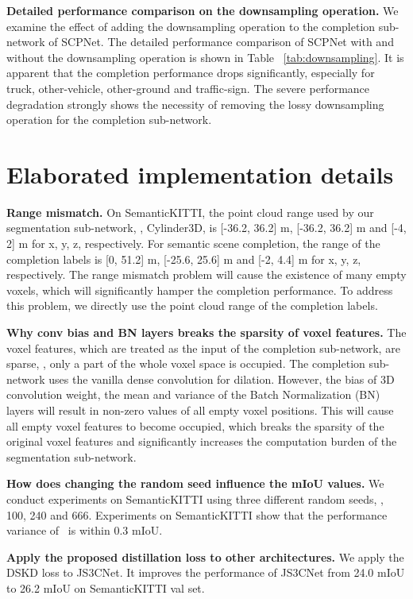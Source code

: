 \documentclass[10pt,twocolumn,letterpaper]{article}
\begin{document}
\noindent \textbf{Detailed performance comparison on the downsampling operation.} We examine the effect of adding the downsampling operation to the completion sub-network of SCPNet. The detailed performance comparison of SCPNet with and without the downsampling operation is shown in Table ~\ref{tab:downsampling}. It is apparent that the completion performance drops significantly, especially for truck, other-vehicle, other-ground and traffic-sign. The severe performance degradation strongly shows the necessity of removing the lossy downsampling operation for the completion sub-network.

\section{Elaborated implementation details}

\noindent \textbf{Range mismatch.} On SemanticKITTI, the point cloud range used by our segmentation sub-network, \ie, Cylinder3D, is [-36.2, 36.2] m, [-36.2, 36.2] m and [-4, 2] m for x, y, z, respectively. For semantic scene completion, the range of the completion labels is [0, 51.2] m, [-25.6, 25.6] m and [-2, 4.4] m for x, y, z, respectively. The range mismatch problem will cause the existence of many empty voxels, which will significantly hamper the completion performance. To address this problem, we directly use the point cloud range of the completion labels. 

\noindent \textbf{Why conv bias and BN layers breaks the sparsity of voxel features.} The voxel features, which are treated as the input of the completion sub-network, are sparse, \ie, only a part of the whole voxel space is occupied. The completion sub-network uses the vanilla dense convolution for dilation. However, the bias of 3D convolution weight, the mean and variance of the Batch Normalization (BN) layers will result in non-zero values of all empty voxel positions. This will cause all empty voxel features to become occupied, which breaks the sparsity of the original voxel features and significantly increases the computation burden of the segmentation sub-network.

\noindent \textbf{How does changing the random seed influence the mIoU values.} We conduct experiments on SemanticKITTI using three different random seeds, \ie, 100, 240 and 666. Experiments on SemanticKITTI show that the performance variance of \algorithmname~is within 0.3 mIoU.

\noindent \textbf{Apply the proposed distillation loss to other architectures.} We apply the DSKD loss to JS3CNet. It improves the performance of JS3CNet from 24.0 mIoU to 26.2 mIoU on SemanticKITTI val set.
\end{document}
